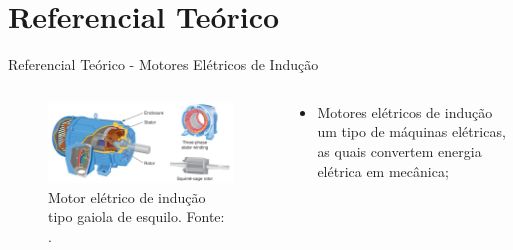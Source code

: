 \documentclass[aspectratio=169]{beamer}
\begin{document}
\section{Referencial Teórico}
\begin{frame}{Referencial Teórico - Motores Elétricos de Indução}
	\begin{columns}
    	\begin{column}{0.50\textwidth}
			\begin{figure}[HT]
				\begin{center}
					\captionsetup{justification=justified}
					\includegraphics[scale=.3]{../referencial/img/ind_motor_petruzella_p115.png}
					\caption{Motor elétrico de indução tipo gaiola de esquilo. \newline
					Fonte: .}
					\label{fig:ind_motor_petruzella_p115}
				\end{center}
			\end{figure}
     	\end{column}
		
		\begin{column}{0.5\textwidth}
			\begin{itemize}
				\item Motores elétricos de indução um tipo de máquinas elétricas, as quais convertem
				energia elétrica em mecânica;
			\end{itemize}
	 	\end{column}
	 \end{columns}
\end{frame}

\end{document}
